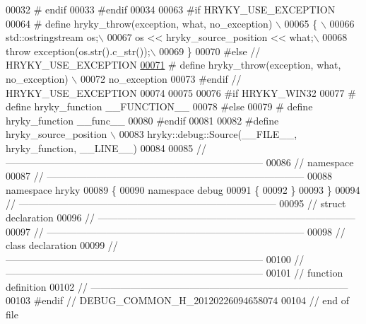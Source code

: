 \begin{DoxyCode}
00032 \textcolor{preprocessor}{}\textcolor{preprocessor}{#   endif}
00033 \textcolor{preprocessor}{}\textcolor{preprocessor}{#endif}
00034 \textcolor{preprocessor}{}
00063 \textcolor{preprocessor}{#if HRYKY\_USE\_EXCEPTION}
00064 \textcolor{preprocessor}{}\textcolor{preprocessor}{#   define hryky\_throw(exception, what, no\_exception) \(\backslash\)}
00065 \textcolor{preprocessor}{    \{ \(\backslash\)}
00066 \textcolor{preprocessor}{        std::ostringstream os;\(\backslash\)}
00067 \textcolor{preprocessor}{        os << hryky\_source\_position << what;\(\backslash\)}
00068 \textcolor{preprocessor}{        throw exception(os.str().c\_str());\(\backslash\)}
00069 \textcolor{preprocessor}{    \}}
00070 \textcolor{preprocessor}{}\textcolor{preprocessor}{#else // HRYKY\_USE\_EXCEPTION}
\hypertarget{debug__common_8h_source_l00071}{}\hyperlink{debug__common_8h_af50606eac4009921527ddcaed392b2c2}{00071} \textcolor{preprocessor}{}\textcolor{preprocessor}{#   define hryky\_throw(exception, what, no\_exception) \(\backslash\)}
00072 \textcolor{preprocessor}{        no\_exception}
00073 \textcolor{preprocessor}{}\textcolor{preprocessor}{#endif // HRYKY\_USE\_EXCEPTION}
00074 \textcolor{preprocessor}{}
00075 
00076 \textcolor{preprocessor}{#if HRYKY\_WIN32}
00077 \textcolor{preprocessor}{}\textcolor{preprocessor}{#   define hryky\_function   \_\_FUNCTION\_\_}
00078 \textcolor{preprocessor}{}\textcolor{preprocessor}{#else}
00079 \textcolor{preprocessor}{}\textcolor{preprocessor}{#   define hryky\_function   \_\_func\_\_}
00080 \textcolor{preprocessor}{}\textcolor{preprocessor}{#endif}
00081 \textcolor{preprocessor}{}
00082 \textcolor{preprocessor}{#define hryky\_source\_position \(\backslash\)}
00083 \textcolor{preprocessor}{    hryky::debug::Source(\_\_FILE\_\_, hryky\_function, \_\_LINE\_\_)}
00084 \textcolor{preprocessor}{}
00085 \textcolor{comment}{//
      ------------------------------------------------------------------------------}
00086 \textcolor{comment}{// namespace}
00087 \textcolor{comment}{//
      ------------------------------------------------------------------------------}
00088 \textcolor{keyword}{namespace }hryky
00089 \{
00090 \textcolor{keyword}{namespace }debug
00091 \{
00092 \}
00093 \}
00094 \textcolor{comment}{//
      ------------------------------------------------------------------------------}
00095 \textcolor{comment}{// struct declaration}
00096 \textcolor{comment}{//
      ------------------------------------------------------------------------------}
00097 \textcolor{comment}{//
      ------------------------------------------------------------------------------}
00098 \textcolor{comment}{// class declaration}
00099 \textcolor{comment}{//
      ------------------------------------------------------------------------------}
00100 \textcolor{comment}{//
      ------------------------------------------------------------------------------}
00101 \textcolor{comment}{// function definition}
00102 \textcolor{comment}{//
      ------------------------------------------------------------------------------}
00103 \textcolor{preprocessor}{#endif // DEBUG\_COMMON\_H\_20120226094658074}
00104 \textcolor{preprocessor}{}\textcolor{comment}{// end of file}
\end{DoxyCode}
